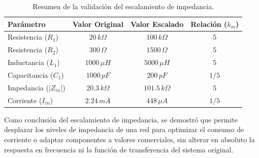 \begin{table}[H]
	\centering
	\begin{tabular}{|l|c|c|c|}
		\hline
		\textbf{Parámetro} & \textbf{Valor Original} & \textbf{Valor Escalado} & \textbf{Relación ($k_m$)} \\ \hline
		Resistencia ($R_1$) & $20 \, k\Omega$ & $100 \, k\Omega$ & $5$ \\ \hline
		Resistencia ($R_2$) & $300 \, \Omega$ & $1500 \, \Omega$ & $5$ \\ \hline
		Inductancia ($L_1$) & $1000 \, \mu H$ & $5000 \, \mu H$ & $5$ \\ \hline
		Capacitancia ($C_1$) & $1000 \, pF$ & $200 \, pF$ & $1/5$ \\ \hline
		Impedancia ($|Z_{in}|$) & $20.3 \, k\Omega$ & $101.5 \, k\Omega$ & $5$ \\ \hline
		Corriente ($I_{in}$) & $2.24 \, mA$ & $448 \, \mu A$ & $1/5$ \\ \hline
	\end{tabular}
	\caption{Resumen de la validación del escalamiento de impedancia.}
\end{table}

Como conclusión del escalamiento de impedancia, se demostró que permite desplazar los niveles de impedancia de una red para optimizar el consumo de corriente o adaptar componentes a valores comerciales, sin alterar en absoluto la respuesta en frecuencia ni la función de transferencia del sistema original.